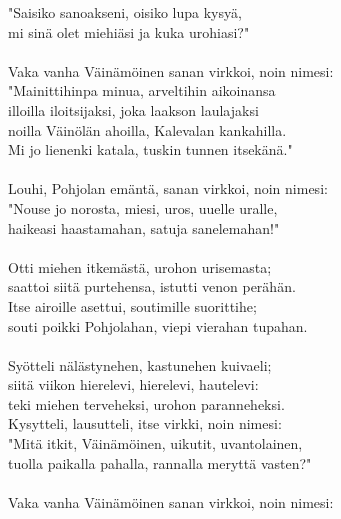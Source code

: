 "Saisiko sanoakseni, oisiko lupa kysyä,                   \\
mi sinä olet miehiäsi ja kuka urohiasi?"                  \\
                                                          \\
Vaka vanha Väinämöinen sanan virkkoi, noin nimesi:        \\
"Mainittihinpa minua, arveltihin aikoinansa               \\
illoilla iloitsijaksi, joka laakson laulajaksi            \\
noilla Väinölän ahoilla, Kalevalan kankahilla.            \\
Mi jo lienenki katala, tuskin tunnen itsekänä."           \\
                                                          \\
Louhi, Pohjolan emäntä, sanan virkkoi, noin nimesi:       \\
"Nouse jo norosta, miesi, uros, uuelle uralle,            \\
haikeasi haastamahan, satuja sanelemahan!"                \\
                                                          \\
Otti miehen itkemästä, urohon urisemasta;                 \\
saattoi siitä purtehensa, istutti venon perähän.          \\
Itse airoille asettui, soutimille suorittihe;             \\
souti poikki Pohjolahan, viepi vierahan tupahan.          \\
                                                          \\
Syötteli nälästynehen, kastunehen kuivaeli;               \\
siitä viikon hierelevi, hierelevi, hautelevi:             \\
teki miehen terveheksi, urohon paranneheksi.              \\
Kysytteli, lausutteli, itse virkki, noin nimesi:          \\
"Mitä itkit, Väinämöinen, uikutit, uvantolainen,          \\
tuolla paikalla pahalla, rannalla meryttä vasten?"        \\
                                                          \\
Vaka vanha Väinämöinen sanan virkkoi, noin nimesi:        \\
